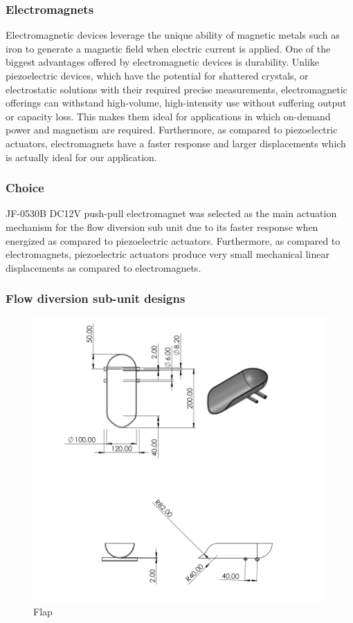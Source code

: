 \subsubsection{Electromagnets}
Electromagnetic devices leverage the unique ability of magnetic metals such as iron to generate a magnetic field when electric current is applied. One of the biggest advantages offered by electromagnetic devices is durability. Unlike piezoelectric devices, which have the potential for shattered crystals, or electrostatic solutions with their required precise measurements, electromagnetic offerings can withstand high-volume, high-intensity use without suffering output or capacity loss\cite{yasumoto2018electromagnetic}. This makes them ideal for applications in which on-demand power and magnetism are required. Furthermore, as compared to piezoelectric actuators, electromagnets have a faster response and larger displacements which is actually ideal for our application.
\subsubsection{Choice}
JF-0530B DC12V push-pull electromagnet was selected as the main actuation mechanism for the flow diversion sub unit due to its faster response when energized as compared to piezoelectric actuators. Furthermore, as compared to electromagnets, piezoelectric actuators produce very small mechanical linear displacements as compared to electromagnets.
\subsubsection{Flow diversion sub-unit designs}
\begin{figure}[H]
\includegraphics[width=0.9\linewidth]{Figures/flap.png}
\centering
\caption{Flap }
\label{fig:flap}
\end{figure}

